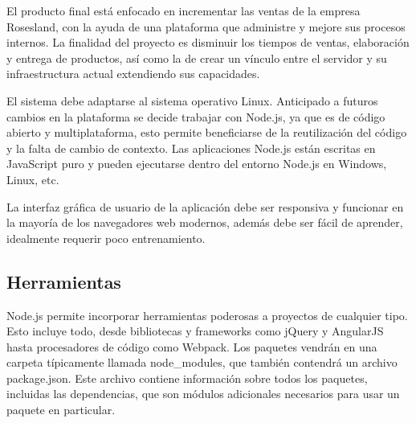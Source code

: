 El producto final está enfocado en incrementar las ventas de la empresa Rosesland, con la ayuda de una plataforma que administre y mejore sus procesos internos. La finalidad del proyecto es disminuir los tiempos de ventas, elaboración y entrega de productos, así como la de crear un vínculo entre el servidor y su infraestructura actual extendiendo sus capacidades.
\vspace{0.8cm}

El sistema debe adaptarse al sistema operativo Linux. Anticipado a futuros cambios en la plataforma se decide trabajar con Node.js, ya que es de código abierto y multiplataforma, esto permite beneficiarse de la reutilización del código y la falta de cambio de contexto. Las aplicaciones Node.js están escritas en JavaScript puro y pueden ejecutarse dentro del entorno Node.js en Windows, Linux, etc.
\vspace{0.8cm}

La interfaz gráfica de usuario de la aplicación debe ser responsiva y funcionar en la mayoría de los navegadores web modernos, además debe ser fácil de aprender, idealmente requerir poco entrenamiento.
\vspace{0.8cm}

\subsection{Herramientas}
Node.js permite incorporar herramientas poderosas a proyectos de cualquier tipo. Esto incluye todo, desde bibliotecas y frameworks como jQuery y AngularJS hasta procesadores de código como Webpack. Los paquetes vendrán en una carpeta típicamente llamada node\_modules, que también contendrá un archivo package.json. Este archivo contiene información sobre todos los paquetes, incluidas las dependencias, que son módulos adicionales necesarios para usar un paquete en particular.

